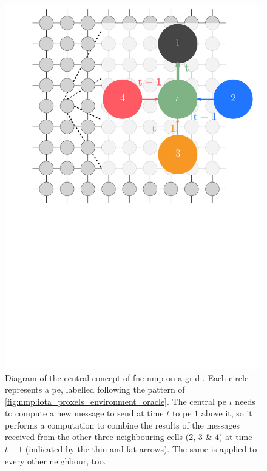 \begin{figure}
    \centering
    \includegraphics[keepaspectratio,width=1.0\linewidth]{chapters/nmp/images/bp_diagram_recoloured_iotacentre.pdf}
    \caption[Diagram of the central concept of \gls{fne}  on a grid]{Diagram of the central concept of \gls{fne} \gls{nmp} on a grid \cite{lbpmpsmpic}.  Each circle represents a \gls{pe}, labelled following the pattern of \cref{fig:nmp:iota_proxels_environment_oracle}.  The central \gls{pe} \(\iota\) needs to compute a new message to send at time \(t\) to \gls{pe} \(1\) above it, so it performs a computation to combine the results of the messages received from the other three neighbouring cells (\(2\), \(3\) \& \(4\)) at time \(t - 1\) (indicated by the thin and fat arrows).  The same is applied to every other neighbour, too.}
    \label{fig:nmp:gridmessaging}
\end{figure}

